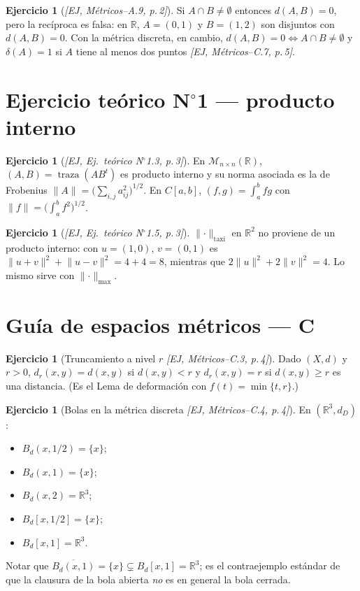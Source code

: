 \documentclass[11pt,a4paper]{article}
\newenvironment{lista}{\leavevmode\begin{itemize}[leftmargin=1.5em,itemsep=1pt,topsep=2pt,parsep=0pt]}{\end{itemize}}
\theoremstyle{definition}
\newtheorem{ejercicio}[definicion]{Ejercicio}
\theoremstyle{plain}
\newcommand{\fnt}[1]{{\normalfont\small\itshape\color{gray!150!black}[#1]}}
\newcommand{\R}{\mathbb{R}}
\newcommand{\cl}[1]{\overline{#1}}
\newcommand{\Bola}[2]{B_d(#1,#2)}
\newcommand{\Bolac}[2]{B_d[#1,#2]}
\newcommand{\norm}[1]{\lVert #1 \rVert}
\begin{document}
\begin{ejercicio}[\fnt{EJ, Métricos--A.9, p.\,2}]
Si $A\cap B\ne\emptyset$ entonces $d(A,B)=0$, pero la recíproca es falsa: en $\R$, $A=(0,1)$ y $B=(1,2)$ son disjuntos con $d(A,B)=0$. Con la métrica discreta, en cambio, $d(A,B)=0\iff A\cap B\ne\emptyset$ y $\delta(A)=1$ si $A$ tiene al menos dos puntos \fnt{EJ, Métricos--C.7, p.\,5}.
\end{ejercicio}

\section{Ejercicio teórico N$^\circ$1 --- producto interno}

\begin{ejercicio}[\fnt{EJ, Ej.\ teórico N$^\circ$1.3, p.\,3}]
En $\mathcal{M}_{n\times n}(\R)$, $(A,B)=\operatorname{traza}(AB^{t})$ es producto interno y su norma asociada es la de Frobenius $\norm{A}=\big(\sum_{i,j}a_{ij}^2\big)^{1/2}$. En $C[a,b]$, $(f,g)=\int_a^b f g$ con $\norm{f}=\big(\int_a^b f^2\big)^{1/2}$.
\end{ejercicio}

\begin{ejercicio}[\fnt{EJ, Ej.\ teórico N$^\circ$1.5, p.\,3}]
$\norm{\cdot}_{\text{taxi}}$ en $\R^2$ no proviene de un producto interno: con $u=(1,0)$, $v=(0,1)$ es $\norm{u+v}^2+\norm{u-v}^2=4+4=8$, mientras que $2\norm{u}^2+2\norm{v}^2=4$. Lo mismo sirve con $\norm{\cdot}_{\max}$.
\end{ejercicio}

\section{Guía de espacios métricos --- C}

\begin{ejercicio}[Truncamiento a nivel $r$ \fnt{EJ, Métricos--C.3, p.\,4}]
Dado $(X,d)$ y $r>0$, $d_r(x,y)=d(x,y)$ si $d(x,y)<r$ y $d_r(x,y)=r$ si $d(x,y)\ge r$ es una distancia. (Es el Lema de deformación con $f(t)=\min\{t,r\}$.)
\end{ejercicio}

\begin{ejercicio}[Bolas en la métrica discreta \fnt{EJ, Métricos--C.4, p.\,4}]
En $(\R^3,d_D)$:
\begin{lista}
\item $\Bola{x}{1/2}=\{x\}$;
\item $\Bola{x}{1}=\{x\}$;
\item $\Bola{x}{2}=\R^3$;
\item $\Bolac{x}{1/2}=\{x\}$;
\item $\Bolac{x}{1}=\R^3$.
\end{lista} Notar que $\cl{\Bola{x}{1}}=\{x\}\subsetneq \Bolac{x}{1}=\R^3$; es el contraejemplo estándar de que la clausura de la bola abierta \emph{no} es en general la bola cerrada.
\end{ejercicio}
\end{document}
